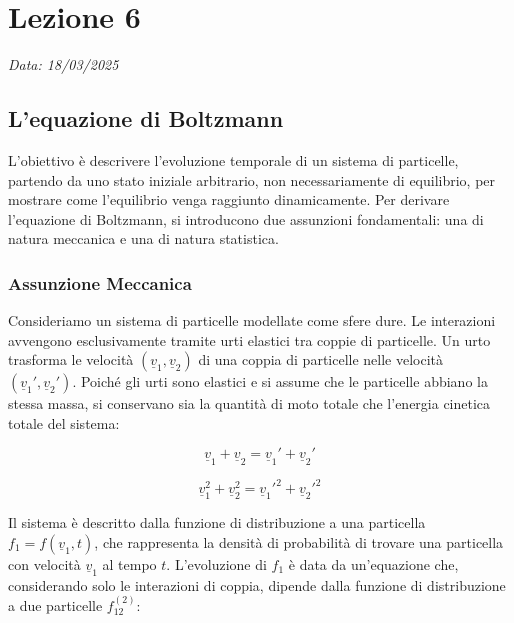 \chapter{Lezione 6}
\label{chap:lezione_06} %

\begin{flushright}
\textit{Data: 18/03/2025}
\end{flushright}
\section{L'equazione di Boltzmann}

L'obiettivo è descrivere l'evoluzione temporale di un sistema di particelle, partendo da uno stato iniziale arbitrario, non necessariamente di equilibrio, per mostrare come l'equilibrio venga raggiunto dinamicamente. Per derivare l'equazione di Boltzmann, si introducono due assunzioni fondamentali: una di natura meccanica e una di natura statistica.

\subsection{Assunzione Meccanica}
Consideriamo un sistema di particelle modellate come sfere dure. Le interazioni avvengono esclusivamente tramite urti elastici tra coppie di particelle. Un urto trasforma le velocità $(\underline{v}_1, \underline{v}_2)$ di una coppia di particelle nelle velocità $(\underline{v}_1', \underline{v}_2')$. Poiché gli urti sono elastici e si assume che le particelle abbiano la stessa massa, si conservano sia la quantità di moto totale che l'energia cinetica totale del sistema:

\begin{equation}
\underline{v}_1 + \underline{v}_2 = \underline{v}_1' + \underline{v}_2'
\end{equation}

\begin{equation}
\underline{v}_1^2 + \underline{v}_2^2 = \underline{v}_1'^2 + \underline{v}_2'^2
\end{equation}

Il sistema è descritto dalla funzione di distribuzione a una particella $f_1 = f(\underline{v}_1, t)$, che rappresenta la densità di probabilità di trovare una particella con velocità $\underline{v}_1$ al tempo $t$. L'evoluzione di $f_1$ è data da un'equazione che, considerando solo le interazioni di coppia, dipende dalla funzione di distribuzione a due particelle $f_{12}^{(2)}$:

